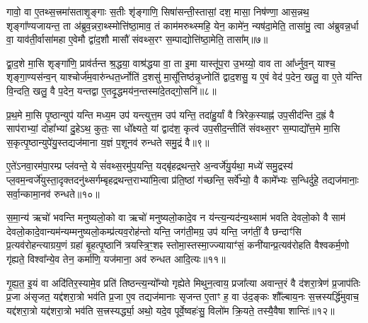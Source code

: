 {\anuvakamend[{गो॒स॒त्त्रं वा ए॑ति सं वथ्स॒रो᳚\-ऽर्धमा॒सा मि॑थु॒नम्म॑ध्य॒तो दे॑व॒याने॑नै॒व वी॒र्य॑न्त्रयो॑दश च॥१॥}]}

गावो॒ वा ए॒तथ्स॒त्त्रमा॑सताशृ॒ङ्गाः स॒तीः शृ॑ङ्गाणि॒ सिषा॑सन्ती॒स्तासां॒ दश॒ मासा॒ निष॑ण्णा॒ आस॒न्नथ॒ शृङ्गा᳚ण्यजायन्त॒ ता अ॑ब्रुव॒न्नरा॒थ्स्मोत्ति॑ष्ठा॒माव॒ तं काम॑मरुथ्स्महि॒ येन॒ कामे॑न॒ न्यष॑दा॒मेति॒ तासा॑मु॒ त्वा अ॑ब्रुवन्न॒र्धा वा॒ याव॑ती॒र्वासा॑महा ए॒वेमौ द्वा॑द॒शौ मासौ॑ संवथ्स॒रꣳ स॒म्पाद्योत्ति॑ष्ठा॒मेति॒ तासा᳚म्॥७॥

द्वा॒द॒शे मा॒सि शृङ्गा॑णि॒ प्राव॑र्तन्त श्र॒द्धया॒ वाश्र॑द्धया वा॒ ता इ॒मा यास्तू॑प॒रा उ॒भय्यो॒ वाव ता आ᳚र्ध्नुव॒न् याश्च॒ शृङ्गा॒ण्यस॑न्व॒न् याश्चोर्ज॑म॒वारु॑न्धत॒र्ध्नोति॑ द॒शसु॑ मा॒सू᳚त्तिष्ठ॑न्नृ॒ध्नोति॑ द्वाद॒शसु॒ य ए॒वं वेद॑ प॒देन॒ खलु॒ वा ए॒ते य॑न्ति वि॒न्दति॒ खलु॒ वै प॒देन॒ यन्तद्वा ए॒तदृ॒द्धमय॑न॒न्तस्मा॑दे॒तद्गो॒सनि॑॥८॥

{\anuvakamend[{ति॒ष्ठा॒मेति॒ तासा॒न्तस्मा॒द्द्वे च॑॥२॥}]}

प्र॒थ॒मे मा॒सि पृ॒ष्ठान्युप॑ यन्ति मध्य॒म उप॑ यन्त्युत्त॒म उप॑ यन्ति॒ तदा॑हु॒र्यां वै त्रिरेक॒स्याह्न॑ उप॒सीद॑न्ति द॒ह्रं वै साप॑राभ्यां॒ दोहा᳚भ्यां दु॒हे\-ऽथ॒ कुतः॒ सा धो᳚क्ष्यते॒ यां द्वाद॑श॒ कृत्व॑ उप॒सीद॒न्तीति॑ संवथ्स॒रꣳ स॒म्पाद्यो᳚त्त॒मे मा॒सि स॒कृत्पृ॒ष्ठान्युपे॑यु॒स्तद्यज॑माना य॒ज्ञं प॒शूनव॑ रुन्धते समु॒द्रं वै॥९॥

ए॒ते॑\-ऽनवा॒रम॑पा॒रम्प्र प्ल॑वन्ते॒ ये सं॑वथ्स॒रमु॑प॒यन्ति॒ यद्बृ॑हद्रथन्त॒रे अ॒न्वर्जे॑यु॒र्यथा॒ मध्ये॑ समु॒द्रस्य॑ प्ल॒वम॒न्वर्जे॑युस्ता॒दृक्त\-दनु॑थ्सर्गम्बृहद्रथन्त॒राभ्या॑मि॒त्वा प्र॑ति॒ष्ठां ग॑च्छन्ति॒ सर्वे᳚भ्यो॒ वै कामे᳚भ्यः स॒न्धिर्दु॑हे॒ तद्यज॑मानाः॒ सर्वा॒न्कामा॒नव॑ रुन्धते॥१०॥

{\anuvakamend[{स॒मु॒द्रं वै चतु॑स्त्रिꣳशच्च॥३॥}]}

स॒मा॒न्य॑ ऋचो॑ भवन्ति मनुष्यलो॒को वा ऋचो॑ मनुष्यलो॒कादे॒व न य॑न्त्य॒न्यद॑न्य॒थ्साम॑ भवति देवलो॒को वै साम॑ देवलो॒कादे॒वान्यम॑न्यम्मनुष्यलो॒कम्प्र॑त्यव॒रोह॑न्तो यन्ति॒ जग॑ती॒मग्र॒ उप॑ यन्ति॒ जग॑तीं॒ वै छन्दाꣳ॑सि प्र॒त्यव॑रोहन्त्याग्रय॒णं ग्रहा॑ बृ॒हत्पृ॒ष्ठानि॑ त्रयस्त्रि॒ꣳ॒शꣴ स्तोमा॒स्तस्मा॒ज्ज्यायाꣳ॑सं॒ कनी॑यान्प्र॒त्यव॑रोहति वैश्वकर्म॒णो गृ॑ह्यते॒ विश्वा᳚न्ये॒व तेन॒ कर्मा॑णि॒ यज॑माना॒ अव॑ रुन्धत आदि॒त्यः॥११॥

गृ॒ह्य॒त॒ इ॒यं वा अदि॑तिर॒स्यामे॒व प्रति॑ तिष्ठन्त्य॒न्यो᳚न्यो गृह्येते मिथुन॒त्वाय॒ प्रजा᳚त्या अवान्त॒रं वै द॑शरा॒त्रेण॑ प्र॒जाप॑तिः प्र॒जा अ॑सृजत॒ यद्द॑शरा॒त्रो भव॑ति प्र॒जा ए॒व तद्यज॑मानाः सृजन्त ए॒ताꣳ ह॒ वा उ॑द॒ङ्कः शौ᳚ल्बाय॒नः स॒त्त्रस्यर्द्धि॑मुवाच॒ यद्द॑शरा॒त्रो यद्द॑शरा॒त्रो भव॑ति स॒त्त्रस्यर्द्ध्या॒ अथो॒ यदे॒व पूर्वे॒ष्वहः॑सु॒ विलो॑म क्रि॒यते॒ तस्यै॒वैषा शान्तिः॑॥१२॥

